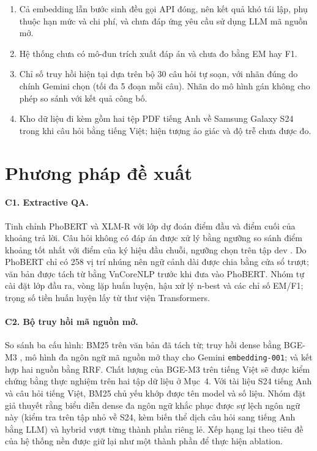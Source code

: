 \documentclass[11pt]{article}
\begin{document}
\begin{enumerate}[label=\textbf{H\arabic*.}]
  \item Cả embedding lẫn bước sinh đều gọi API đóng, nên kết quả khó tái lập, phụ thuộc hạn mức và chi phí, và chưa đáp ứng yêu cầu sử dụng LLM mã nguồn mở.
  \item Hệ thống chưa có mô-đun trích xuất đáp án và chưa đo bằng EM hay F1.
  \item Chỉ số truy hồi hiện tại dựa trên bộ 30 câu hỏi tự soạn, với nhãn đúng do chính Gemini chọn (tối đa 5 đoạn mỗi câu). Nhãn do mô hình gán không cho phép so sánh với kết quả công bố.
  \item Kho dữ liệu đi kèm gồm hai tệp PDF tiếng Anh về Samsung Galaxy S24 trong khi câu hỏi bằng tiếng Việt; hiện tượng ảo giác và độ trễ chưa được đo.
\end{enumerate}

\section{Phương pháp đề xuất}

\paragraph{C1. Extractive QA.} Tinh chỉnh PhoBERT \citep{nguyen-tuan-nguyen-2020-phobert} và XLM-R \citep{conneau-etal-2020-unsupervised} với lớp dự đoán điểm đầu và điểm cuối của khoảng trả lời. Câu hỏi không có đáp án được xử lý bằng ngưỡng so sánh điểm khoảng tốt nhất với điểm của ký hiệu đầu chuỗi, ngưỡng chọn trên tập dev \citep{rajpurkar-etal-2018-know}. Do PhoBERT chỉ có 258 vị trí nhúng nên ngữ cảnh dài được chia bằng cửa sổ trượt; văn bản được tách từ bằng VnCoreNLP \citep{vu-etal-2018-vncorenlp} trước khi đưa vào PhoBERT. Nhóm tự cài đặt lớp đầu ra, vòng lặp huấn luyện, hậu xử lý n-best và các chỉ số EM/F1; trọng số tiền huấn luyện lấy từ thư viện Transformers.

\paragraph{C2. Bộ truy hồi mã nguồn mở.} So sánh ba cấu hình: BM25 trên văn bản đã tách từ; truy hồi dense \citep{karpukhin-etal-2020-dense} bằng BGE-M3 \citep{chen-etal-2024-m3}, mô hình đa ngôn ngữ mã nguồn mở thay cho Gemini \texttt{embedding-001}; và kết hợp hai nguồn bằng RRF. Chất lượng của BGE-M3 trên tiếng Việt sẽ được kiểm chứng bằng thực nghiệm trên hai tập dữ liệu ở Mục~4. Với tài liệu S24 tiếng Anh và câu hỏi tiếng Việt, BM25 chủ yếu khớp được tên model và số liệu. Nhóm đặt giả thuyết rằng biểu diễn dense đa ngôn ngữ khắc phục được sự lệch ngôn ngữ này (kiểm tra trên tập nhỏ về S24, kèm biến thể dịch câu hỏi sang tiếng Anh bằng LLM) và hybrid vượt từng thành phần riêng lẻ. Xếp hạng lại theo tiêu đề của hệ thống nền được giữ lại như một thành phần để thực hiện ablation.
\end{document}
